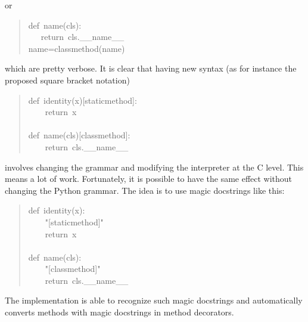 \documentclass[11pt,english]{article}
\begin{document}
or
\begin{quote}
\begin{ttfamily}\begin{flushleft}
\mbox{def~name(cls):}\\
\mbox{~~~return~cls.{\_}{\_}name{\_}{\_}}\\
\mbox{name=classmethod(name)}
\end{flushleft}\end{ttfamily}
\end{quote}

which are pretty verbose. It is clear that having new syntax (as 
for instance the proposed square bracket notation)
\begin{quote}
\begin{ttfamily}\begin{flushleft}
\mbox{def~identity(x)[staticmethod]:}\\
\mbox{~~~~return~x}\\
\mbox{}\\
\mbox{def~name(cls)[classmethod]:}\\
\mbox{~~~~return~cls.{\_}{\_}name{\_}{\_}}
\end{flushleft}\end{ttfamily}
\end{quote}

involves changing the grammar and modifying the interpreter at the
C level. This means a lot of work. Fortunately, it is possible to 
have the same effect without changing the Python grammar. 
The idea is to use magic docstrings like this:
\begin{quote}
\begin{ttfamily}\begin{flushleft}
\mbox{def~identity(x):}\\
\mbox{~~~~"[staticmethod]"}\\
\mbox{~~~~return~x}\\
\mbox{}\\
\mbox{def~name(cls):}\\
\mbox{~~~~"[classmethod]"}\\
\mbox{~~~~return~cls.{\_}{\_}name{\_}{\_}}
\end{flushleft}\end{ttfamily}
\end{quote}

The implementation is able to recognize such magic docstrings
and automatically converts methods with magic docstrings in 
method decorators.
\end{document}
